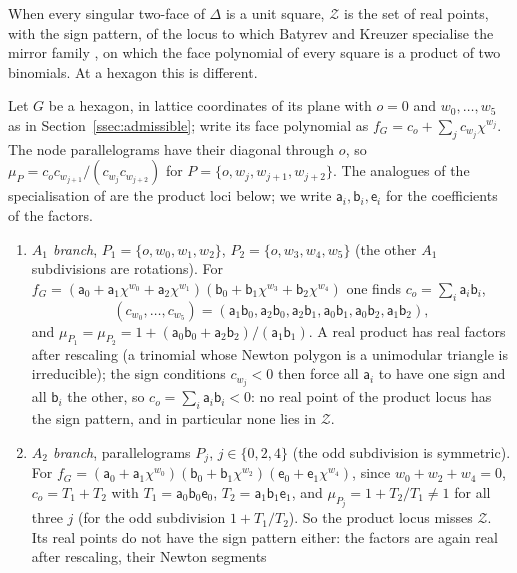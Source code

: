 When every singular two-face of $\Delta$ is a unit square, $\mathcal Z$ is the set of real points, with the sign
pattern, of the locus to which Batyrev and Kreuzer specialise the mirror family \cite[\S3]{BK10}, on which the face
polynomial of every square is a product of two binomials. At a hexagon this is different.

\begin{remark}\label{rem:hexface}
Let $G$ be a hexagon, in lattice coordinates of its plane with $o=0$ and $w_0,\dots,w_5$ as in
Section~\ref{ssec:admissible}; write its face polynomial as $f_G=c_o+\sum_jc_{w_j}\chi^{w_j}$. The node parallelograms have
their diagonal through $o$, so $\mu_P=c_oc_{w_{j+1}}/(c_{w_j}c_{w_{j+2}})$ for $P=\{o,w_j,w_{j+1},w_{j+2}\}$. The analogues of the
specialisation of \cite{BK10} are the product loci below; we write $\mathsf a_i,\mathsf b_i,\mathsf e_i$ for the
coefficients of the factors.
\begin{enumerate}
\item \emph{$A_1$ branch}, $P_1=\{o,w_0,w_1,w_2\}$, $P_2=\{o,w_3,w_4,w_5\}$ (the other $A_1$ subdivisions are rotations).
For $f_G=(\mathsf a_0+\mathsf a_1\chi^{w_0}+\mathsf a_2\chi^{w_1})(\mathsf b_0+\mathsf b_1\chi^{w_3}+\mathsf b_2\chi^{w_4})$
one finds $c_o=\sum_i\mathsf a_i\mathsf b_i$,
\[
(c_{w_0},\dots,c_{w_5})=(\mathsf a_1\mathsf b_0,\mathsf a_2\mathsf b_0,\mathsf a_2\mathsf b_1,\mathsf a_0\mathsf b_1,\mathsf
a_0\mathsf b_2,\mathsf a_1\mathsf b_2),
\]
and $\mu_{P_1}=\mu_{P_2}=1+(\mathsf a_0\mathsf b_0+\mathsf a_2\mathsf b_2)/(\mathsf a_1\mathsf b_1)$. A real product has real
factors after rescaling (a trinomial whose Newton polygon is a unimodular triangle is irreducible); the sign
conditions $c_{w_j}<0$ then force all $\mathsf a_i$ to have one sign and all $\mathsf b_i$ the other, so
$c_o=\sum_i\mathsf a_i\mathsf b_i<0$: no real point of the product locus has the sign pattern, and in particular none lies
in $\mathcal Z$.
\item \emph{$A_2$ branch}, parallelograms $P_j$, $j\in\{0,2,4\}$ (the odd subdivision is symmetric). For
$f_G=(\mathsf a_0+\mathsf a_1\chi^{w_0})(\mathsf b_0+\mathsf b_1\chi^{w_2})(\mathsf e_0+\mathsf e_1\chi^{w_4})$, since
$w_0+w_2+w_4=0$, $c_o=T_1+T_2$ with $T_1=\mathsf a_0\mathsf b_0\mathsf e_0$, $T_2=\mathsf a_1\mathsf b_1\mathsf e_1$, and
$\mu_{P_j}=1+T_2/T_1\neq1$ for all three $j$ (for the odd subdivision $1+T_1/T_2$). So the product locus misses $\mathcal Z$.
Its real points do not have the sign pattern either: the factors are again real after rescaling, their Newton segments

\end{enumerate}
\end{remark}
